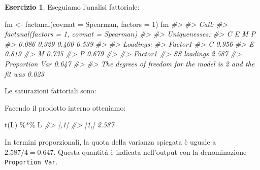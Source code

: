 \documentclass[
  11pt,
]{krantz}
\makeatletter
\newenvironment{Shaded}{\begin{snugshade}}{\end{snugshade}}
\newcommand{\AttributeTok}[1]{\textcolor[rgb]{0.61,0.61,0.61}{#1}}
\newcommand{\CommentTok}[1]{\textcolor[rgb]{0.37,0.37,0.37}{\textit{#1}}}
\newcommand{\DecValTok}[1]{\textcolor[rgb]{0.06,0.06,0.06}{#1}}
\newcommand{\FunctionTok}[1]{\textcolor[rgb]{0,0,0}{#1}}
\newcommand{\NormalTok}[1]{#1}
\newcommand{\OtherTok}[1]{\textcolor[rgb]{0.37,0.37,0.37}{#1}}
\newcommand{\SpecialCharTok}[1]{\textcolor[rgb]{0,0,0}{#1}}
\newenvironment{kframe}{%
\medskip{}
\setlength{\fboxsep}{.8em}
 \def\at@end@of@kframe{}%
 \ifinner\ifhmode%
  \def\at@end@of@kframe{\end{minipage}}%
  \begin{minipage}{\columnwidth}%
 \fi\fi%
 \def\FrameCommand##1{\hskip\@totalleftmargin \hskip-\fboxsep
 \colorbox{shadecolor}{##1}\hskip-\fboxsep
     \hskip-\linewidth \hskip-\@totalleftmargin \hskip\columnwidth}%
 \MakeFramed {\advance\hsize-\width
   \@totalleftmargin\z@ \linewidth\hsize
   \@setminipage}}%
 {\par\unskip\endMakeFramed%
 \at@end@of@kframe}
\renewenvironment{Shaded}{\begin{kframe}}{\end{kframe}}
\theoremstyle{definition}
\theoremstyle{definition}
\theoremstyle{definition}
\newtheorem{exercise}{Esercizio}[chapter]
\theoremstyle{definition}
\theoremstyle{remark}
\makeatother
\begin{document}
\begin{exercise}
Eseguiamo l'analisi fattoriale:

\begin{Shaded}
\begin{Highlighting}[]
\NormalTok{fm }\OtherTok{\textless{}{-}} \FunctionTok{factanal}\NormalTok{(}\AttributeTok{covmat =}\NormalTok{ Spearman, }\AttributeTok{factors =} \DecValTok{1}\NormalTok{)}
\NormalTok{fm}
\CommentTok{\#\textgreater{} }
\CommentTok{\#\textgreater{} Call:}
\CommentTok{\#\textgreater{} factanal(factors = 1, covmat = Spearman)}
\CommentTok{\#\textgreater{} }
\CommentTok{\#\textgreater{} Uniquenesses:}
\CommentTok{\#\textgreater{}     C     E     M     P }
\CommentTok{\#\textgreater{} 0.086 0.329 0.460 0.539 }
\CommentTok{\#\textgreater{} }
\CommentTok{\#\textgreater{} Loadings:}
\CommentTok{\#\textgreater{}   Factor1}
\CommentTok{\#\textgreater{} C 0.956  }
\CommentTok{\#\textgreater{} E 0.819  }
\CommentTok{\#\textgreater{} M 0.735  }
\CommentTok{\#\textgreater{} P 0.679  }
\CommentTok{\#\textgreater{} }
\CommentTok{\#\textgreater{}                Factor1}
\CommentTok{\#\textgreater{} SS loadings      2.587}
\CommentTok{\#\textgreater{} Proportion Var   0.647}
\CommentTok{\#\textgreater{} }
\CommentTok{\#\textgreater{} The degrees of freedom for the model is 2 and the fit was 0.023}
\end{Highlighting}
\end{Shaded}

Le saturazioni fattoriali sono:

\begin{Shaded}
\end{Shaded}

Facendo il prodotto interno otteniamo:

\begin{Shaded}
\begin{Highlighting}[]
\FunctionTok{t}\NormalTok{(L) }\SpecialCharTok{\%*\%}\NormalTok{ L}
\CommentTok{\#\textgreater{}       [,1]}
\CommentTok{\#\textgreater{} [1,] 2.587}
\end{Highlighting}
\end{Shaded}

In termini proporzionali, la quota della varianza spiegata è uguale a \(2.587 / 4 = 0.647\). Questa quantità è indicata nell'output con la denominazione \texttt{Proportion\ Var}.
\end{exercise}
\end{document}
